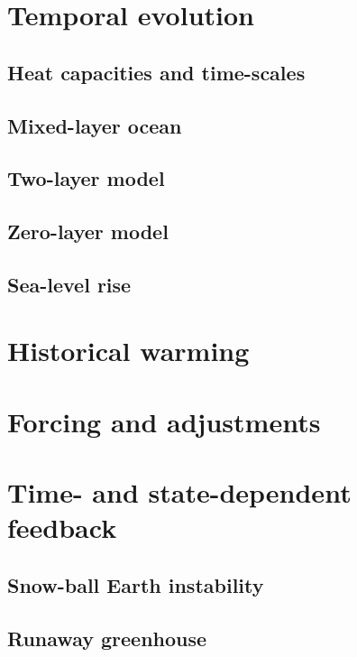 \documentclass[12pt]{book}
\begin{document}
\chapter{Temporal evolution}
\section{Heat capacities and time-scales}
\section{Mixed-layer ocean}
\section{Two-layer model}
\section{Zero-layer model}
\section{Sea-level rise}

\chapter{Historical warming}

\chapter{Forcing and adjustments}

\chapter{Time- and state-dependent feedback}
\section{Snow-ball Earth instability}
\section{Runaway greenhouse}
\end{document}
